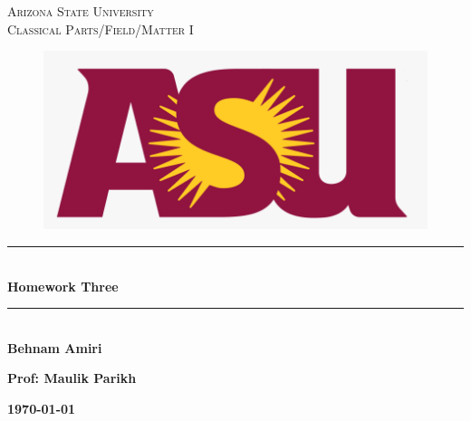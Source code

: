 \documentclass[fleqn]{article}
\begin{document}
  \begin{titlepage}

    \newcommand{\HRule}{\rule{\linewidth}{0.5mm}}

    \center


    \textsc{\LARGE Arizona State University}\\[1.5cm]

    \textsc{\LARGE Classical Parts/Field/Matter I}\\[1.5cm]


    \begin{figure}
      \includegraphics[width=\linewidth]{asu.png}
    \end{figure}


    \HRule \\[0.4cm]
    { \huge \bfseries Homework Three}\\[0.4cm] 
    \HRule \\[1.5cm]

    \textbf{Behnam Amiri}

    \bigbreak

    \textbf{Prof: Maulik Parikh}

    \bigbreak


    \textbf{{\large \today}\\[2cm]}

    \vfill

  \end{titlepage}
\end{document}
